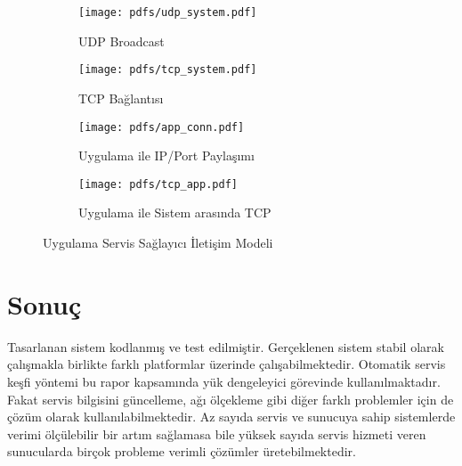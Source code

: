 \documentclass[12pt]{article}
\begin{document}
\begin{justify}
\begin{figure}[H]
    \centering
    \begin{subfigure}[b]{0.475\textwidth}
        \centering
        \texttt{[image: pdfs/udp\_system.pdf]}
        \caption{UDP Broadcast}
        \label{fig:udp_broadcast}
    \end{subfigure}
    \hfill
    \begin{subfigure}[b]{0.475\textwidth}
        \centering
        \texttt{[image: pdfs/tcp\_system.pdf]}
        \caption{TCP Bağlantısı}
        \label{fig:tcp_broadcast}
    \end{subfigure}
    \vfill
    \centering
    \begin{subfigure}[b]{0.475\textwidth}
        \centering
        \texttt{[image: pdfs/app\_conn.pdf]}
        \caption{Uygulama ile IP/Port Paylaşımı}
        \label{fig:app_conn}
    \end{subfigure}
    \hfill
    \begin{subfigure}[b]{0.475\textwidth}
        \centering
        \texttt{[image: pdfs/tcp\_app.pdf]}
        \caption{Uygulama ile Sistem arasında TCP}
        \label{fig:tcp_app}
    \end{subfigure}
       \caption{Uygulama Servis Sağlayıcı İletişim Modeli}
       \label{fig:new_model}
\end{figure}

\section{Sonuç}
Tasarlanan sistem kodlanmış ve test edilmiştir. Gerçeklenen sistem stabil olarak çalışmakla birlikte farklı platformlar üzerinde çalışabilmektedir. Otomatik servis keşfi yöntemi bu rapor kapsamında yük dengeleyici görevinde kullanılmaktadır. Fakat servis bilgisini güncelleme, ağı ölçekleme gibi diğer farklı problemler için de çözüm olarak kullanılabilmektedir. Az sayıda servis ve sunucuya sahip sistemlerde verimi ölçülebilir bir artım sağlamasa bile yüksek sayıda servis hizmeti veren sunucularda birçok probleme verimli çözümler üretebilmektedir.
\end{justify}
\end{document}
